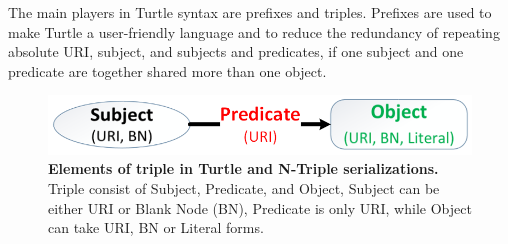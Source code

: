 The main players in Turtle syntax are prefixes and triples. Prefixes are used to make Turtle a user-friendly language and to reduce the redundancy of repeating absolute URI, subject, and subjects and predicates, if one subject and one predicate are together shared  more than one object. 

\begin{figure}[ht]
	\begin{center}
		\includegraphics[scale=0.4,angle=0]{images/TurtleandNtripleElements.png}
				\setlength\belowcaptionskip{-5mm}
		\caption{\textbf{ Elements of triple in Turtle and N-Triple serializations.} Triple consist of Subject, Predicate, and Object, Subject can be either URI or Blank Node (BN), Predicate is only URI, while Object can take URI, BN or Literal forms.}
		\label{Fig:TurtleandNtripleElements}
	\end{center}
\end{figure}


